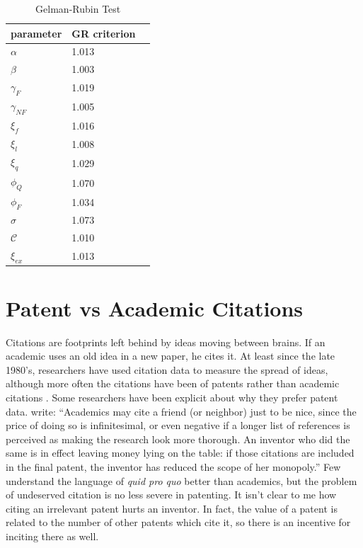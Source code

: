 \begin{table}[!ht]
    \centering
    \begin{tabular}{lll}
        \hline
        parameter       & GR criterion \\ \hline \hline
        $\alpha$        & 1.013  \\
        $\beta$         & 1.003  \\
        $\gamma_{F}$    & 1.019  \\
        $\gamma_{NF}$   & 1.005  \\
        $\xi_f$         & 1.016  \\
        $\xi_l$         & 1.008  \\
        $\xi_q$         & 1.029  \\
        $\phi_Q$        & 1.070  \\
        $\phi_F$        & 1.034  \\
        $\sigma$        & 1.073  \\
        $\mathcal{C}$   & 1.010  \\
        $\xi_{ex}$      & 1.013  \\ \hline
    \end{tabular}
    \caption{Gelman-Rubin Test}
    \label{tab:grtest}
\end{table}

\section{Patent vs Academic Citations}

Citations are footprints left behind by ideas moving between brains. If
an academic uses an old idea in a new paper, he cites it. At least since
the late 1980's, researchers have used citation data to measure the
spread of ideas, although more often the citations have been of patents
rather than academic citations \citep{griliches1998patent}. Some
researchers have been explicit about why they prefer patent data.
\citep{jaffe2002patents} write: ``Academics may cite a friend (or
neighbor) just to be nice, since the price of doing so is infinitesimal,
or even negative if a longer list of references is perceived as making
the research look more thorough. An inventor who did the same is in
effect leaving money lying on the table: if those citations are included
in the final patent, the inventor has reduced the scope of her
monopoly.'' Few understand the language of \emph{quid pro quo} better
than academics, but the problem of undeserved citation is no less severe
in patenting. It isn't clear to me how citing an irrelevant patent hurts
an inventor. In fact, the value of a patent is related to the number of
other patents which cite it, so there is an incentive for inciting there
as well.

